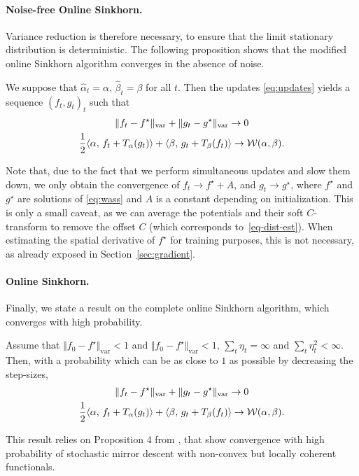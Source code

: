 \paragraph{Noise-free Online Sinkhorn.}

Variance reduction is therefore necessary, to ensure that the limit stationary
distribution is deterministic. The following proposition shows that the modified online Sinkhorn algorithm converges in the absence of noise.

\begin{proposition}\label{eq:deterministic}
    We suppose that $\hat \alpha_t = \alpha$, $\hat \beta_t = \beta$ for all
    $t$. Then the updates \eqref{eq:updates} yields a sequence $(f_t, g_t)_t$ such
    that 
    \begin{gather}
        \Vert f_t - f^\star \Vert_{\text{var}} 
        + \Vert g_t - g^\star \Vert_{\text{var}} \to 0 \\
        \frac{1}{2} \langle \alpha,\,f_t + T_{\alpha}(g_t)\rangle + \langle \beta,\,g_t + T_{\beta}(f_t)\rangle 
         \to \mathcal{W}(\alpha, \beta).
    \end{gather}
\end{proposition}
Note that, due to the fact that we perform simultaneous updates and slow them
down, we only obtain the convergence of $f_t \to f^\star + A$, and $g_t \to
g^\star$, where $f^\star$ and $g^\star$ are solutions of \eqref{eq:wass} and $A$
is a constant depending on initialization. This is only a small caveat, as we
can average the potentials and their soft $C$-transform to remove the offset
$C$ (which corresponds to~\eqref{eq-dist-est}). When estimating the spatial derivative of $f^\star$ for training purposes, this is not necessary, as already exposed in Section~\ref{sec:gradient}.

\paragraph{Online Sinkhorn.}

Finally, we state a result on the complete online Sinkhorn algorithm, which converges with high probability.
 
\begin{proposition}
    Assume that $\Vert f_0 - f^\star \Vert_{\text{var}} < 1$ and $\Vert f_0 -
    f^\star \Vert_{\text{var}} < 1$, $\sum_t \eta_t = \infty$ and $\sum_t
    \eta_t^2 < \infty$. Then, with a probability which can be as close to $1$
    as possible by decreasing the step-sizes,
    \begin{gather}
        \Vert f_t - f^\star \Vert_{\text{var}} + \Vert g_t - 
        g^\star \Vert_{\text{var}} \to 0 \\
        \frac{1}{2} \langle \alpha,\,f_t + T_{\alpha}(g_t)\rangle + \langle \beta,\,g_t + T_{\beta}(f_t)\rangle 
        \to \mathcal{W}(\alpha, \beta).
    \end{gather}
\end{proposition}
% 
This result relies on Proposition 4 from \cite{zhou2017convergence}, that show convergence with
high probability of stochastic mirror descent with non-convex but locally coherent functionals.

